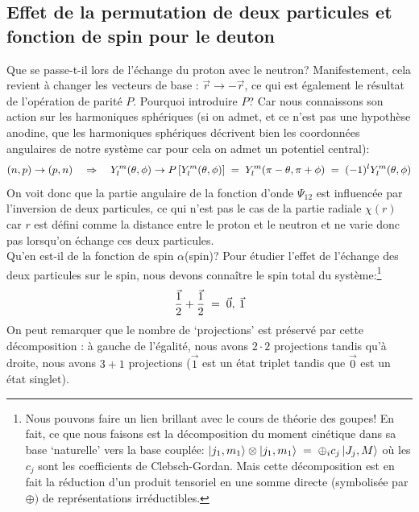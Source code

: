 \subsection{Effet de la permutation de deux particules et fonction de spin pour le deuton}\label{Permut_deuton}


Que se passe-t-il lors de l'échange du proton avec le neutron? Manifestement, cela revient à changer les vecteurs de base : $\vec{r} \rightarrow -\vec{r}$, ce qui est également le résultat de l'opération de parité $P$. Pourquoi introduire $P$? Car nous connaissons son action sur les harmoniques sphériques (si on admet, et ce n'est pas une hypothèse anodine, que les harmoniques sphériques décrivent bien les coordonnées angulaires de notre système car pour cela on admet un potentiel central):
\[
    (n,p)\rightarrow (p,n) \quad \Rightarrow \quad
    Y^m_l(\theta,\phi) \rightarrow P\left[ Y^m_l(\theta,\phi) \right] 
    \; = \; Y^m_l(\pi-\theta,\pi+\phi) \; = \; (-1)^l Y^m_l(\theta,\phi)
\]
On voit donc que la partie angulaire de la fonction d'onde $\Psi_{12}$ est influencée par l'inversion de deux particules, ce qui n'est pas le cas de la partie radiale $\chi(r)$ car $r$ est défini comme la distance entre le proton et le neutron et ne varie donc pas lorsqu'on échange ces deux particules.\\
Qu'en est-il de la fonction de spin $\alpha$(spin)? Pour étudier l'effet de l'échange des deux particules sur le spin, nous devons connaître le spin total du système:\footnote{Nous pouvons faire un lien brillant avec le cours de théorie des goupes! En fait, ce que nous faisons est la décomposition du moment cinétique dans sa base `naturelle' vers la base couplée: $\ket{j_1,m_1} \otimes \ket{j_1,m_1} \; = \; \oplus_i c_j \ket{J_j,M}$ où les $c_j$ sont les coefficients de Clebsch-Gordan. Mais cette décomposition est en fait la réduction d'un produit tensoriel en une somme directe (symbolisée par $\oplus)$ de représentations irréductibles.}
\[
    \vec{\dfrac{1}{2}} + \vec{\dfrac{1}{2}} \; = \; \vec{0}, \: \vec{1}
\]
On peut remarquer que le nombre de `projections' est préservé par cette décomposition : à gauche de l'égalité, nous avons $2\cdot 2$ projections tandis qu'à droite, nous avons $3+1$ projections ($\vec{1}$ est un état triplet tandis que $\vec{0}$ est un état singlet).\\


